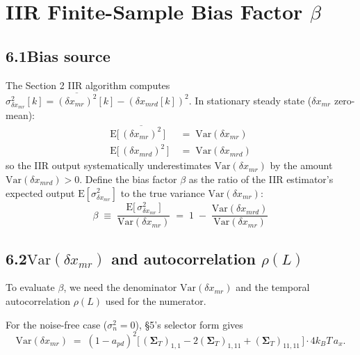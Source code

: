 \documentclass[11pt]{article}
\newcommand{\kB}{k_B}
\begin{document}
\section{IIR Finite-Sample Bias Factor $\beta$}

\subsection*{6.1\quad Bias source}

The Section 2 IIR algorithm computes
$\sigma^{2}_{\delta x_{mr}}[k] = \overline{(\delta x_{mr})^{2}}[k] - (\delta x_{mrd}[k])^{2}$.
In stationary steady state ($\delta x_{mr}$ zero-mean):
\begin{align}
\mathrm{E}\bigl[\,\overline{(\delta x_{mr})^{2}}\,\bigr] &\;=\; \mathrm{Var}(\delta x_{mr}) \\[2pt]
\mathrm{E}\bigl[\,(\delta x_{mrd})^{2}\,\bigr] &\;=\; \mathrm{Var}(\delta x_{mrd})
\end{align}
so the IIR output systematically underestimates $\mathrm{Var}(\delta x_{mr})$ by the amount $\mathrm{Var}(\delta x_{mrd}) > 0$. Define the bias factor $\beta$ as the ratio of the IIR estimator's expected output $\mathrm{E}[\sigma^{2}_{\delta x_{mr}}]$ to the true variance $\mathrm{Var}(\delta x_{mr})$:
\begin{equation}
\beta \;\equiv\; \frac{\mathrm{E}\!\bigl[\,\sigma^{2}_{\delta x_{mr}}\,\bigr]}{\mathrm{Var}(\delta x_{mr})}
       \;=\; 1 \;-\; \frac{\mathrm{Var}(\delta x_{mrd})}{\mathrm{Var}(\delta x_{mr})}
\end{equation}

\subsection*{6.2\quad $\mathrm{Var}(\delta x_{mr})$ and autocorrelation $\rho(L)$}

\noindent To evaluate $\beta$, we need the denominator $\mathrm{Var}(\delta x_{mr})$ and the temporal autocorrelation $\rho(L)$ used for the numerator.

For the noise-free case ($\sigma^{2}_n = 0$), \S5's selector form gives
\begin{equation}
\mathrm{Var}(\delta x_{mr}) \;=\; (1{-}a_{pd})^{2}\bigl[\,(\bm{\Sigma}_T)_{1,1} - 2(\bm{\Sigma}_T)_{1,11} + (\bm{\Sigma}_T)_{11,11}\,\bigr]\cdot 4\kB T\, a_x.
\end{equation}
\end{document}
